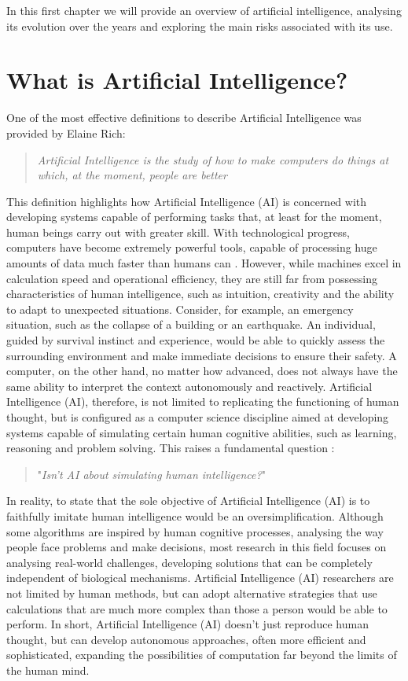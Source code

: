 
In this first chapter we will provide an overview of artificial intelligence, analysing its evolution over the years and  exploring the main risks associated with its use.

\section{What is Artificial Intelligence?}
One of the most effective definitions to describe Artificial Intelligence was provided by Elaine Rich\cite{RADA1986119}:
\begin{quote}
    \textit{Artificial Intelligence is the study of how to make computers do things at which, at the moment, people are better}
\end{quote}
This definition highlights how Artificial Intelligence (AI) is concerned with developing systems capable of performing tasks that, at least for the moment, human beings carry out with greater skill. With technological progress, computers have become extremely powerful tools, capable of processing huge amounts of data much faster than humans can \cite{introductionAI}.
However, while machines excel in calculation speed and operational efficiency, they are still far from possessing characteristics of human intelligence, such as intuition, creativity and the ability to adapt to unexpected situations.
Consider, for example, an emergency situation, such as the collapse of a building or an earthquake. An individual, guided by survival instinct and experience, would be able to quickly assess the surrounding environment and make immediate decisions to ensure their safety. A computer, on the other hand, no matter how advanced, does not always have the same ability to interpret the context autonomously and reactively.
Artificial Intelligence (AI), therefore, is not limited to replicating the functioning of human thought, but is configured as a computer science discipline aimed at developing systems capable of simulating certain human cognitive abilities, such as learning, reasoning and problem solving. This raises a fundamental question \cite{McCarthy2007}:  
\begin{quote}
    "\textit{Isn’t AI about simulating human intelligence?}"
\end{quote}
In reality, to state that the sole objective of Artificial Intelligence (AI) is to faithfully imitate human intelligence would be an oversimplification. Although some algorithms are inspired by human cognitive processes, analysing the way people face problems and make decisions, most research in this field focuses on analysing real-world challenges, developing solutions that can be completely independent of biological mechanisms. Artificial Intelligence (AI) researchers are not limited by human methods, but can adopt alternative strategies that use calculations that are much more complex than those a person would be able to perform.
In short, Artificial Intelligence (AI) doesn't just reproduce human thought, but can develop autonomous approaches, often more efficient and sophisticated, expanding the possibilities of computation far beyond the limits of the human mind.
